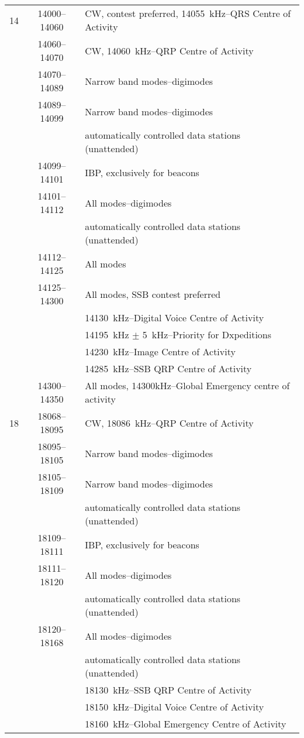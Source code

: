 \begin{longtable}{lcl}
14   & 14000--14060 & CW, contest preferred, 14055~kHz--QRS Centre of Activity\\
     & 14060--14070 & CW, 14060~kHz--QRP Centre of Activity\\
     & 14070--14089 & Narrow band modes--digimodes\\
     & 14089--14099 & Narrow band modes--digimodes\\
     & & automatically controlled data stations (unattended)\\
     & 14099--14101 & IBP, exclusively for beacons\\
     & 14101--14112 & All modes--digimodes\\
     & & automatically controlled data stations (unattended)\\
     & 14112--14125 & All modes\\
     & 14125--14300 & All modes, SSB contest preferred\\
     & & 14130~kHz--Digital Voice Centre of Activity\\
     & & 14195~kHz \(\pm\) 5~kHz--Priority for Dxpeditions\\
     & & 14230~kHz--Image Centre of Activity\\
     & & 14285~kHz--SSB QRP Centre of Activity\\
     & 14300--14350 & All modes, 14300kHz--Global Emergency centre of activity\\

18   & 18068--18095 & CW, 18086~kHz--QRP Centre of Activity\\
     & 18095--18105 & Narrow band modes--digimodes\\
     & 18105--18109 & Narrow band modes--digimodes\\
     & & automatically controlled data stations (unattended)\\
     & 18109--18111 & IBP, exclusively for beacons\\
     & 18111--18120 & All modes--digimodes\\
     & & automatically controlled data stations (unattended)\\
     & 18120--18168 & All modes--digimodes\\
     & & automatically controlled data stations (unattended)\\
     & & 18130~kHz--SSB QRP Centre of Activity\\
     & & 18150~kHz--Digital Voice Centre of Activity\\
     & & 18160~kHz--Global Emergency Centre of Activity\\


\end{longtable}

